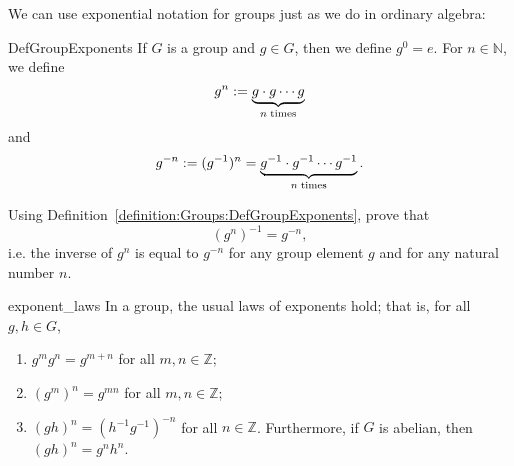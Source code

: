 We can use exponential notation for groups just as we do in ordinary
algebra:

\begin{defn}{DefGroupExponents}
 If $G$ is a group and $g \in G$, then we define $g^0 = e$.
For $n \in {\mathbb N}$, we define 
\[
g^n := \underbrace{g \cdot g \cdots g}_{n \; {\rm times}}
\]
and
\[
g^{-n} := (g^{-1})^n =  \underbrace{g^{-1} \cdot g^{-1} \cdots g^{-1}}_{n \; {\rm times}}. \]
 \end{defn}
 
\begin{exercise}{57}
Using Definition~\ref{definition:Groups:DefGroupExponents}, prove that 
\[ (g^n)^{-1} = g^{-n},\]
i.e. the inverse of $g^n$ is equal to $g^{-n}$ for any group element $g$ and for any natural number $n$.
\end{exercise}

\begin{prop}{exponent_laws} 
In a group, the usual laws of exponents hold; that is, for all $g, h \in G$,
\begin{enumerate}
 
\item
$g^mg^n = g^{m+n}$ for all $m, n \in {\mathbb Z}$; 
 
\item
$(g^m)^n = g^{mn}$ for all $m, n \in {\mathbb Z}$; 
 
\item
$(gh)^n = (h^{-1}g^{-1})^{-n}$ for all $n \in {\mathbb Z}$. Furthermore,
if $G$ is abelian, then $(gh)^n = g^nh^n$. 
 
\end{enumerate}
\end{prop}
 
